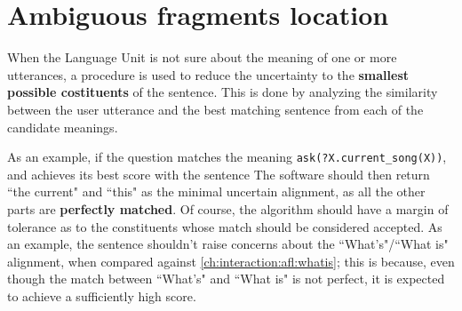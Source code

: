 
\section{Ambiguous fragments location} \label{ch:interaction:afl}
When the Language Unit is not sure about the meaning of one or more utterances, a procedure is used to reduce the uncertainty to the \textbf{smallest possible costituents} of the sentence. This is done by analyzing the similarity between the user utterance and the best matching sentence from each of the candidate meanings.

As an example, if the question
 \label{ch:interaction:afl:whatisthis}
matches the meaning \texttt{ask(?X.current\_song(X))}, and achieves its best score with the sentence 
 \label{ch:interaction:afl:whatis}
The software should then return ``the current" and ``this" as the minimal uncertain alignment, as all the other parts are \textbf{perfectly matched}. Of course, the algorithm should have a margin of tolerance as to the constituents whose match should be considered accepted. As an example, the sentence
shouldn't raise concerns about the ``What's"/``What is" alignment, when compared against \ref{ch:interaction:afl:whatis}; this is because, even though the match between ``What's" and ``What is" is not perfect, it is expected to achieve a sufficiently high score.

